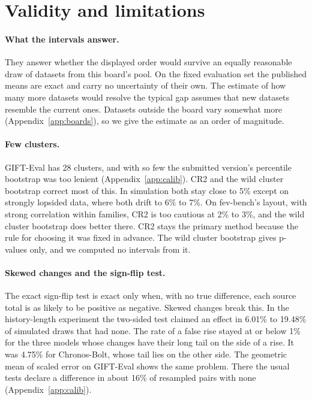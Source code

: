 \documentclass{article}
\begin{document}
\section{Validity and limitations}
\label{app:validity}

\paragraph{What the intervals answer.} They answer whether the displayed order would survive an
equally reasonable draw of datasets from this board's pool. On the fixed evaluation set the
published means are exact and carry no uncertainty of their own. The estimate of how many more
datasets would resolve the typical gap assumes that new datasets resemble the current ones.
Datasets outside the board vary somewhat more (Appendix~\ref{app:boards}), so we give the
estimate as an order of magnitude.

\paragraph{Few clusters.} GIFT-Eval has 28 clusters, and with so few the submitted version's
percentile bootstrap was too lenient (Appendix~\ref{app:calib}). CR2 and the wild cluster
bootstrap correct most of this. In simulation both stay close to 5\% except on strongly
lopsided data, where both drift to 6\% to 7\%. On fev-bench's layout, with strong correlation
within families, CR2 is too cautious at 2\% to 3\%, and the wild cluster bootstrap does better
there. CR2 stays the primary method because the rule for choosing it was fixed in advance. The
wild cluster bootstrap gives p-values only, and we computed no intervals from it.

\paragraph{Skewed changes and the sign-flip test.} The exact sign-flip test is exact only when,
with no true difference, each source total is as likely to be positive as negative. Skewed
changes break this. In the history-length experiment the two-sided test claimed an effect in
6.01\% to 19.48\% of simulated draws that had none. The rate of a false rise stayed at or below
1\% for the three models whose changes have their long tail on the side of a rise. It was
4.75\% for Chronos-Bolt, whose tail lies on the other side. The geometric mean of scaled error
on GIFT-Eval shows the same problem. There the usual tests declare a difference in about 16\%
of resampled pairs with none (Appendix~\ref{app:calib}).
\end{document}
